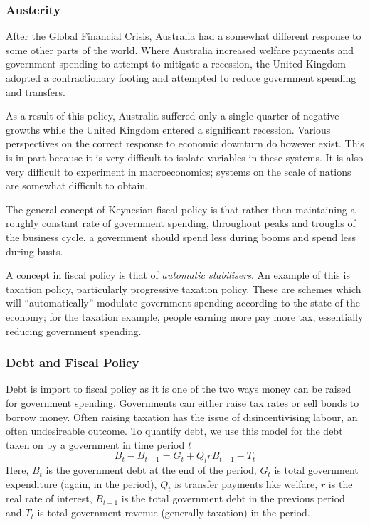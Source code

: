 \documentclass[12pt]{report}
\begin{document}
\begin{flushleft}
\subsubsection*{Austerity}

After the Global Financial Crisis, Australia had a somewhat different response
to some other parts of the world. Where Australia increased welfare payments
and government spending to attempt to mitigate a recession, the United Kingdom
adopted a contractionary footing and attempted to reduce government spending
and transfers. \par
As a result of this policy, Australia suffered only a single quarter of
negative growths while the United Kingdom entered a significant recession.
Various perspectives on the correct response to economic downturn do however
exist. This is in part because it is very difficult to isolate variables in
these systems. It is also very difficult to experiment in macroeconomics;
systems on the scale of nations are somewhat difficult to obtain. \par
The general concept of Keynesian fiscal policy is that rather than maintaining
a roughly constant rate of government spending, throughout peaks and troughs
of the business cycle, a government should spend less during booms and spend
less during busts. \par
A concept in fiscal policy is that of \textit{automatic stabilisers}. An
example of this is taxation policy, particularly progressive taxation policy.
These are schemes which will ``automatically'' modulate government spending
according to the state of the economy; for the taxation example, people earning
more pay more tax, essentially reducing government spending.

\subsubsection*{Debt and Fiscal Policy}

Debt is import to fiscal policy as it is one of the two ways money can be 
raised for government spending. Governments can either raise tax rates or sell
bonds to borrow money. Often raising taxation has the issue of disincentivising
labour, an often undesireable outcome. To quantify debt, we use this model
for the debt taken on by a government in time period \(t\)
\[B_t - B_{t - 1} = G_t + Q_t rB_{t - 1} - T_t\] 
Here, \(B_t\) is the government debt at the end of the period, \(G_t\) is total
government expenditure (again, in the period), \(Q_t\) is transfer payments
like welfare, \(r\) is the real rate of interest, \(B_{t - 1}\) is the total
government debt in the previous period and \(T_t\) is total government revenue
(generally taxation) in the period.


\end{flushleft}
\end{document}

